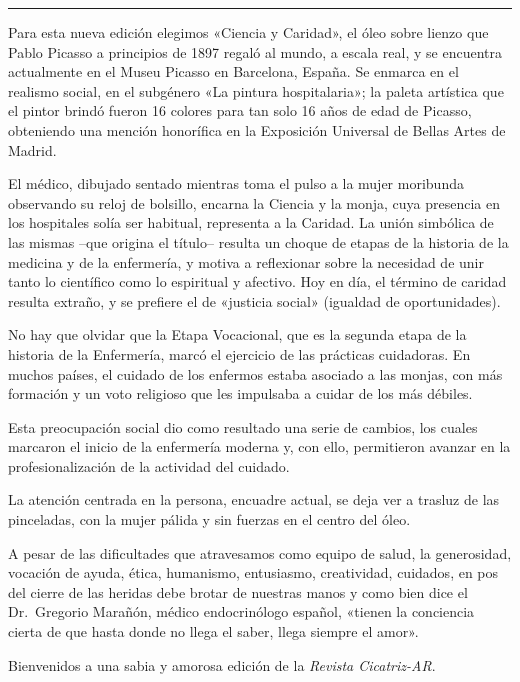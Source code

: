\bigskip
\noindent\rule{\linewidth}{0.4pt}
\bigskip

Para esta nueva edición elegimos «Ciencia y Caridad», el óleo sobre lienzo que Pablo Picasso a principios de 1897 regaló al mundo, a escala real, y se encuentra actualmente en el Museu Picasso en Barcelona, España. Se enmarca en el realismo social, en el subgénero «La pintura hospitalaria»; la paleta artística que el pintor brindó fueron 16 colores para tan solo 16 años de edad de Picasso, obteniendo una mención honorífica en la Exposición Universal de Bellas Artes de Madrid.

El médico, dibujado sentado mientras toma el pulso a la mujer moribunda observando su reloj de bolsillo, encarna la Ciencia y la monja, cuya presencia en los hospitales solía ser habitual, representa a la Caridad. La unión simbólica de las mismas –que origina el título– resulta un choque de etapas de la historia de la medicina y de la enfermería, y motiva a reflexionar sobre la necesidad de unir tanto lo científico como lo espiritual y afectivo. Hoy en día, el término de caridad resulta extraño, y se prefiere el de «justicia social» (igualdad de oportunidades).

No hay que olvidar que la Etapa Vocacional, que es la segunda etapa de la historia de la Enfermería, marcó el ejercicio de las prácticas cuidadoras. En muchos países, el cuidado de los enfermos estaba asociado a las monjas, con más formación y un voto religioso que les impulsaba a cuidar de los más débiles.

Esta preocupación social dio como resultado una serie de cambios, los cuales marcaron el inicio de la enfermería moderna y, con ello, permitieron avanzar en la profesionalización de la actividad del cuidado.

La atención centrada en la persona, encuadre actual, se deja ver a trasluz de las pinceladas, con la mujer pálida y sin fuerzas en el centro del óleo.

A pesar de las dificultades que atravesamos como equipo de salud, la generosidad, vocación de ayuda, ética, humanismo, entusiasmo, creatividad, cuidados, en pos del cierre de las heridas debe brotar de nuestras manos y como bien dice el Dr. Gregorio Marañón, médico endocrinólogo español, «tienen la conciencia cierta de que hasta donde no llega el saber, llega siempre el amor».

Bienvenidos a una sabia y amorosa edición de la \emph{Revista Cicatriz-AR}.

